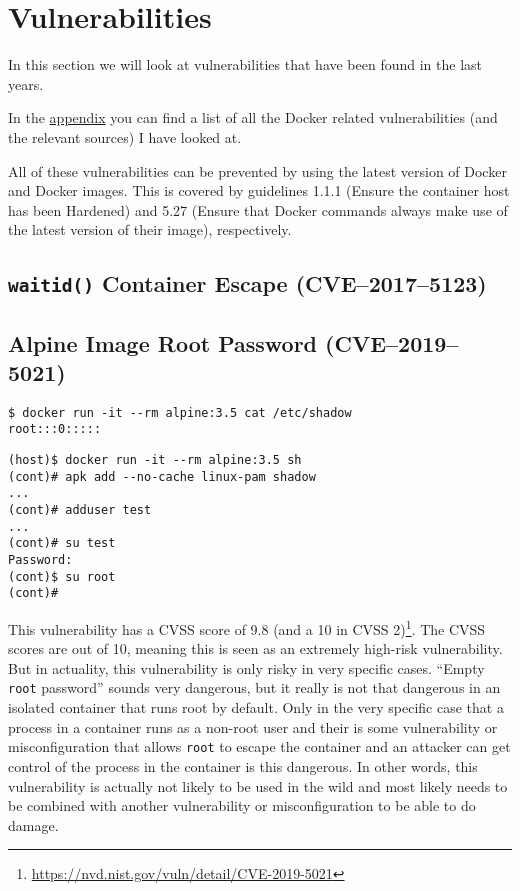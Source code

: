 \section{Vulnerabilities}
In this section we will look at vulnerabilities that have been found in the last years.

\hfill

In the \hyperref[appendix:CVE-List]{appendix} you can find a list of all the Docker related vulnerabilities (and the relevant sources) I have looked at.

\hfill

All of these vulnerabilities can be prevented by using the latest version of Docker and Docker images. This is covered by guidelines 1.1.1 (Ensure the container host has been Hardened) and 5.27 (Ensure that Docker commands always make use of the latest version of their image), respectively.

\subsection{\texorpdfstring{\lstinline{waitid()}}{waitid()} Container Escape (CVE--2017--5123)}

\subsection{Alpine Image Root Password (CVE--2019--5021)}
\begin{lstlisting}
$ docker run -it --rm alpine:3.5 cat /etc/shadow
root:::0:::::
\end{lstlisting}

\begin{lstlisting}
(host)$ docker run -it --rm alpine:3.5 sh
(cont)# apk add --no-cache linux-pam shadow
...
(cont)# adduser test
...
(cont)# su test
Password:
(cont)$ su root
(cont)#
\end{lstlisting}

This vulnerability has a CVSS score of 9.8 (and a 10 in CVSS 2)\footnote{\url{https://nvd.nist.gov/vuln/detail/CVE-2019-5021}}. The CVSS scores are out of 10, meaning this is seen as an extremely high-risk vulnerability. But in actuality, this vulnerability is only risky in very specific cases. ``Empty \lstinline{root} password'' sounds very dangerous, but it really is not that dangerous in an isolated container that runs root by default. Only in the very specific case that a process in a container runs as a non-root user and their is some vulnerability or misconfiguration that allows \lstinline{root} to escape the container and an attacker can get control of the process in the container is this dangerous. In other words, this vulnerability is actually not likely to be used in the wild and most likely needs to be combined with another vulnerability or misconfiguration to be able to do damage.

